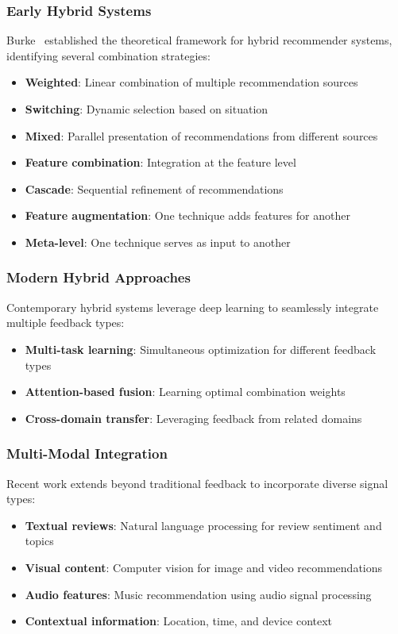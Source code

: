 \subsubsection{Early Hybrid Systems}
Burke~\cite{burke2002hybrid} established the theoretical framework for hybrid recommender systems, identifying several combination strategies:
\begin{itemize}
    \item \textbf{Weighted}: Linear combination of multiple recommendation sources
    \item \textbf{Switching}: Dynamic selection based on situation
    \item \textbf{Mixed}: Parallel presentation of recommendations from different sources
    \item \textbf{Feature combination}: Integration at the feature level
    \item \textbf{Cascade}: Sequential refinement of recommendations
    \item \textbf{Feature augmentation}: One technique adds features for another
    \item \textbf{Meta-level}: One technique serves as input to another
\end{itemize}

\subsubsection{Modern Hybrid Approaches}
Contemporary hybrid systems leverage deep learning to seamlessly integrate multiple feedback types:
\begin{itemize}
    \item \textbf{Multi-task learning}: Simultaneous optimization for different feedback types~\cite{ma2018modeling}
    \item \textbf{Attention-based fusion}: Learning optimal combination weights~\cite{chen2017attentive}
    \item \textbf{Cross-domain transfer}: Leveraging feedback from related domains~\cite{zhu2019transfer}
\end{itemize}

\subsubsection{Multi-Modal Integration}
Recent work extends beyond traditional feedback to incorporate diverse signal types:
\begin{itemize}
    \item \textbf{Textual reviews}: Natural language processing for review sentiment and topics~\cite{zheng2018joint}
    \item \textbf{Visual content}: Computer vision for image and video recommendations~\cite{wei2021contrastive}
    \item \textbf{Audio features}: Music recommendation using audio signal processing~\cite{van2013deep}
    \item \textbf{Contextual information}: Location, time, and device context~\cite{adomavicius2011context}
\end{itemize}

